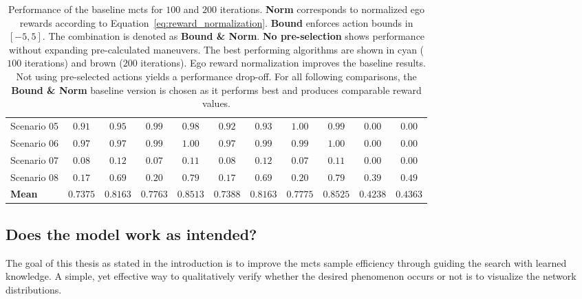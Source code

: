 \begin{landscape}
\begin{table}[h]
{\begin{tabular}{lcccccccccc}
    Scenario 05 & $0.91$ & $0.95$ & $0.99$ & $0.98$ & $0.92$ & $0.93$ & \cellcolor{lightkit}$1.00$ & \cellcolor{lightbrown}$0.99$ & $0.00$ & $0.00$ \\
    Scenario 06 & $0.97$ & $0.97$ & \cellcolor{lightkit}$0.99$ & \cellcolor{lightbrown}$1.00$ & $0.97$ & $0.99$ & \cellcolor{lightkit}$0.99$ & \cellcolor{lightbrown}$1.00$ & $0.00$ & $0.00$ \\
    Scenario 07 & \cellcolor{lightkit}$0.08$ & \cellcolor{lightbrown}$0.12$ & $0.07$ & $0.11$ & \cellcolor{lightkit}$0.08$ & \cellcolor{lightbrown}$0.12$ & $0.07$ & $0.11$ & $0.00$ & $0.00$ \\
    Scenario 08 & $0.17$ & $0.69$ & $0.20$ & \cellcolor{lightbrown}$0.79$ & $0.17$ & $0.69$ & $0.20$ & \cellcolor{lightbrown}$0.79$ & \cellcolor{lightkit}$0.39$ & $0.49$ \\
    \midrule
    \textbf{Mean} & $0.7375$ & $0.8163$ & $0.7763$ & $0.8513$  & $0.7388$ & $0.8163$ &  \cellcolor{lightkit}$0.7775$ & \cellcolor{lightbrown}$0.8525$  & $0.4238$ & $0.4363$  \\
    \bottomrule
  \end{tabular}
  }
\caption[Baseline performance for $100$ and $200$ iterations]{Performance of the baseline \gls{mcts} for $100$ and $200$ iterations. \textbf{Norm} corresponds to normalized ego rewards according to Equation~\ref{eq:reward_normalization}. \textbf{Bound} enforces action bounds in $[-5, 5]$. The combination is denoted as \textbf{Bound \& Norm}. \textbf{No pre-selection} shows performance without expanding pre-calculated maneuvers. The best performing algorithms are shown in cyan ($100$ iterations) and brown ($200$ iterations). Ego reward normalization improves the baseline results. Not using pre-selected actions yields a performance drop-off. For all following comparisons, the \textbf{Bound \& Norm} baseline version is chosen as it performs best and produces comparable reward values.}
\label{tab:baseline_performance}
\end{table}
\end{landscape}


\subsection{Does the model work as intended?}\label{ssec:eval_pruning}
The goal of this thesis as stated in the introduction is to improve the \gls{mcts} sample efficiency through guiding the search with learned knowledge. A simple, yet effective way to qualitatively verify whether the desired phenomenon occurs or not is to visualize the network distributions.

